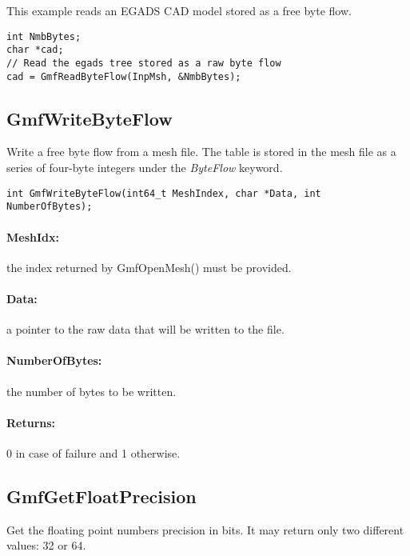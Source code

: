 \documentclass[a4paper,12pt]{article}
\begin{document}
This example reads an EGADS CAD model stored as a free byte flow.

\begin{tt}
\begin{verbatim}
int NmbBytes;
char *cad;
// Read the egads tree stored as a raw byte flow
cad = GmfReadByteFlow(InpMsh, &NmbBytes);
\end{verbatim}
\end{tt}
\normalfont


\subsection{GmfWriteByteFlow}
Write a free byte flow from a mesh file.
The table is stored in the mesh file as a series of four-byte integers under the \emph{ByteFlow} keyword.

\begin{tt}
\begin{verbatim}
int GmfWriteByteFlow(int64_t MeshIndex, char *Data, int NumberOfBytes);
\end{verbatim}
\end{tt}
\normalfont

\paragraph{MeshIdx:}
the index returned by GmfOpenMesh() must be provided.

\paragraph{Data:} a pointer to the raw data that will be written to the file.

\paragraph{NumberOfBytes:} the number of bytes to be written.

\paragraph{Returns:} 0 in case of failure and 1 otherwise.


\subsection{GmfGetFloatPrecision}
Get the floating point numbers precision in bits.
It may return only two different values: 32 or 64.
\end{document}
